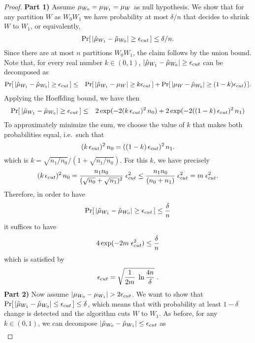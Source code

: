 
\begin{proof}

{\bf{Part 1)}}
Assume ${\mu}_{W_0}={\mu}_{W_1}=\mu_W$ as null hypothesis. We show that for any partition
$W$ as $W_0W_1$ we have probability at most $\delta/n$ that \adwinz
decides to shrink $W$ to $W_1$, or equivalently,
%
\begin{eqnarray*}
\Pr [\, |\hat{\mu}_{W_1} - \hat{\mu}_{W_0}| \ge  \epsilon_{cut}\, ] \le \delta/n.
\end{eqnarray*}
%
Since there are at most $n$ partitions $W_0W_1$, the claim follows by the union bound. 
Note that, for every real number $k\in (0,1)$, $|\hat{\mu}_{W_1} - \hat{\mu}_{W_0}|\ge  \epsilon_{cut}$ 
can be decomposed as
\begin{eqnarray*}
\label{Edecomposeprobs1}
\Pr [\, |\hat{\mu}_{W_1} - \hat{\mu}_{W_0}| \ge  \epsilon_{cut} \,]
&\le& \Pr [\, |\hat{\mu}_{W_1} - \mu_W| \ge  k \epsilon_{cut} \,] + \Pr[\, |\mu_W - \hat{\mu}_{W_0}| \ge  (1-k)\epsilon_{cut} )\,].
\end{eqnarray*} 
Applying the Hoeffding bound, we have then 
\begin{eqnarray*}
\label{Edecomposeprobs2}
\Pr [\, |\hat{\mu}_{W_1} - \hat{\mu}_{W_0}| \ge  \epsilon_{cut} \,]
&\le& 2\exp(-2 (k\,\epsilon_{cut})^2 \,n_0) + 2\exp(-2 ((1-k)\,\epsilon_{cut})^2 \,n_1)
\end{eqnarray*} 
To approximately minimize the sum, we choose the value of $k$ 
that makes both probabilities equal, i.e.\ such that 
$$
(k \,\epsilon_{cut})^2 \,n_0 = ((1-k)\,\epsilon_{cut})^2 \,n_1. 
$$
which is $k=\sqrt{n_1 / n_0} / (1+\sqrt{n_1 / n_0})$. 
For this $k$, we have precisely 
$$
(k \,\epsilon_{cut})^2 \, n_0 
      = \frac{n_1 n_0}{(\sqrt{n_0}+\sqrt{n_1})^2}\; \epsilon_{cut}^2 
      \le \frac{n_1 n_0}{(n_0+n_1)} \; \epsilon_{cut}^2
      = m \; \epsilon_{cut}^2. 
$$
Therefore, in order to have 
$$
\Pr [\, |\hat{\mu}_{W_1} - \hat{\mu}_{W_0}| \ge  \epsilon_{cut} \,] \le \frac{\delta}{n}
$$
it suffices to have 
$$
4 \exp(-2m \; \epsilon_{cut}^2) \le \frac{\delta}{n}
$$
which is satisfied by 
$$
\epsilon_{cut} = \sqrt{\frac{1}{2m} \; \ln\frac{4n}{\delta}}\;.
$$
{\bf{Part 2)}}
Now assume $|\muz - \muu| > %
 2\epsc$. We want to show that
$\Pr [\, |\hat{\mu}_{W_1} - \hat{\mu}_{W_0}| \le  \epsilon_{cut} \,] \le \delta$, which means that 
with probability at least $1-\delta$ change is detected and 
the algorithm cuts $W$ to $W_1$. 
As before, for any $k\in (0,1)$, we can decompose $|\hat{\mu}_{W_0} - \hat{\mu}_{W_1}| \le  \epsilon_{cut} $ as
%
\begin{eqnarray*}

\end{eqnarray*}
\end{proof}

